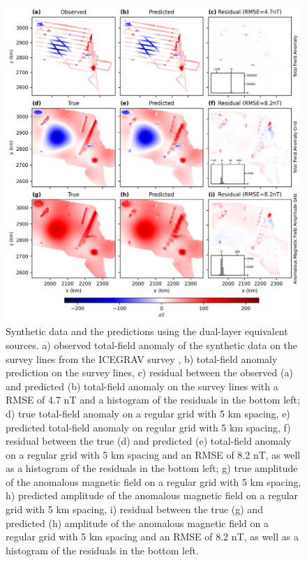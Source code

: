 \begin{figure}[tb!]
\centering
\includegraphics[width=1\linewidth]{figures/dual_layer_synthetic.png}
\caption{
    Synthetic data and the predictions using the dual-layer equivalent sources. a) observed total-field anomaly of the synthetic data on the survey lines from the ICEGRAV survey \citep{ICEGRAV_data}, b) total-field anomaly prediction on the survey lines, c) residual between the observed (a) and predicted (b) total-field anomaly on the survey lines with a RMSE of 4.7 nT and a histogram of the residuals in the bottom left; d) true total-field anomaly on a regular grid with 5 km spacing, e) predicted total-field anomaly on regular grid with 5 km spacing, f) residual between the true (d) and predicted (e) total-field anomaly on a regular grid with 5 km spacing and an RMSE of 8.2 nT, as well as a histogram of the residuals in the bottom left; g) true amplitude of the anomalous magnetic field on a regular grid with 5 km spacing, h) predicted amplitude of the anomalous magnetic field on a regular grid with 5 km spacing, i) residual between the true (g) and predicted (h) amplitude of the anomalous magnetic field on a regular grid with 5 km spacing and an RMSE of 8.2 nT, as well as a histogram of the residuals in the bottom left.
}
\label{fig:dual_layer_synthetic}
\end{figure}

